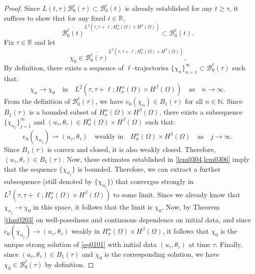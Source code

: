 \documentclass[oneside,preprint,12pt,numbers,sort&compress]{elsarticle}
\begin{document}
\begin{proof}
Since $L(t, \tau) \mathcal{B}_0^\ell(\tau) \subset \mathcal{B}_0^\ell(t)$ is already established for any $t\geq\tau$, it suffices to show that for any fixed $t \in \mathbb{R}$, 
\[
\overline{\mathcal{B}_0^\ell(t)}^{L^{2}(\tau,\tau+\ell;H_\sigma^{\alpha}(\Omega) \times H^{\beta}(\Omega))} \subset \mathcal{B}_0^\ell(t).
\]  
Fix $\tau \in \mathbb{R}$ and let $$\chi_0 \in \overline{\mathcal{B}_0^\ell(\tau)}^{L^{2}(\tau,\tau+\ell;H_\sigma^{\alpha}(\Omega) \times H^{\beta}(\Omega))}.$$
By definition, there exists a sequence of $\ell$-trajectories $\{\chi_n\}_{n=1}^{\infty} \subset \mathcal{B}_0^\ell(\tau)$ such that:
\[
\chi_n \to \chi_0 \quad \text{in} \quad L^{2}(\tau, \tau+\ell; H_\sigma^{\alpha}(\Omega) \times H^{\beta}(\Omega)) \quad \text{as} \quad n \to \infty.
\]
From the definition of $\mathcal{B}_0^\ell(\tau)$, we have $e_0(\chi_n) \in B_1(\tau)$ for all $n \in \mathbb{N}$. Since $B_1(\tau)$ is a bounded subset of $H_\sigma^{\alpha}(\Omega) \times H^{\beta}(\Omega)$, there exists a subsequence $\{\chi_{n_j}\}_{j=1}^{\infty}$ and $(u_{\tau}, \theta_{\tau}) \in H_\sigma^{\alpha}(\Omega) \times H^{\beta}(\Omega)$ such that:
\[
e_0(\chi_{n_j}) \rightharpoonup (u_{\tau}, \theta_{\tau}) \quad \text{weakly in} \quad H_\sigma^{\alpha}(\Omega) \times H^{\beta}(\Omega) \quad \text{as} \quad j \to \infty.
\]
Since $B_1(\tau)$ is convex and closed, it is also weakly closed. Therefore, $(u_{\tau}, \theta_{\tau}) \in B_1(\tau)$. Now, these estimates established in \cref{lem0304,lem0306} imply that the sequence $\{\chi_{n_j}\}$ is bounded. Therefore, we can extract a further subsequence (still denoted by $\{\chi_{n_j}\}$) that converges strongly in $L^{2}(\tau, \tau+\ell; H_\sigma^{\alpha}(\Omega) \times H^{\beta}(\Omega))$ to some limit. Since we already know that $\chi_{n_j} \to \chi_0$ in this space, it follows that the limit is $\chi_0$. Now, by Theorem \ref{thm0203} on well-posedness and continuous dependence on initial data, and since $e_0(\chi_{n_j}) \to (u_{\tau}, \theta_{\tau})$ weakly in $H_\sigma^{\alpha}(\Omega) \times H^{\beta}(\Omega)$, it follows that $\chi_0$ is the unique strong solution of \eqref{eq0101} with initial data $(u_{\tau}, \theta_{\tau})$ at time $\tau$. Finally, since $(u_{\tau}, \theta_{\tau}) \in B_1(\tau)$ and $\chi_0$ is the corresponding solution, we have $\chi_0 \in \mathcal{B}_0^\ell(\tau)$ by definition.
\end{proof}
\end{document}

